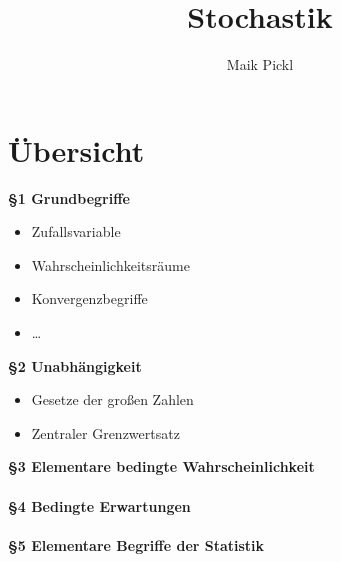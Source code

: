 \documentclass[10pt,a4paper]{report}
\author{Maik Pickl}
\title{Stochastik}
\begin{document}
\chapter*{Übersicht}
\textbf{\S 1 \qquad Grundbegriffe}
\begin{itemize}
\item Zufallsvariable
\item Wahrscheinlichkeitsräume
\item Konvergenzbegriffe
\item \dots
\end{itemize}
\textbf{\S 2 \qquad Unabhängigkeit}
\begin{itemize}
\item Gesetze der großen Zahlen
\item Zentraler Grenzwertsatz
\end{itemize}
\textbf{\S 3 \qquad Elementare bedingte Wahrscheinlichkeit}\\\\
\textbf{\S 4 \qquad Bedingte Erwartungen}\\\\
\textbf{\S 5 \qquad Elementare Begriffe der Statistik}\\\\
\end{document}
